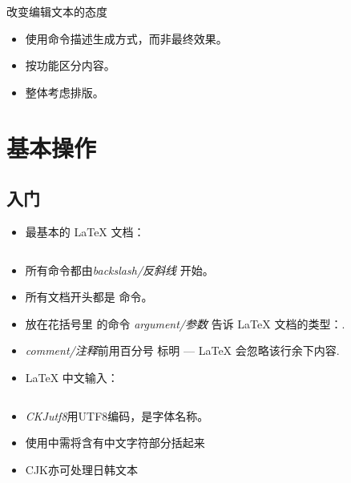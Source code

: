 \documentclass{beamer}
\begin{document}
\begin{frame}[fragile]{改变编辑文本的态度}

\begin{itemize}
\item 使用命令描述生成方式，而非最终效果。
\item 按功能区分内容。
\item 整体考虑排版。
\end{itemize}
\end{frame}

\section{基本操作}

\subsection{入门}
\begin{frame}[fragile]{\insertsubsection}
\begin{itemize}
\item 最基本的 \LaTeX{} 文档：
\inputminted[frame=single]{latex}{basics.tex}
\item 所有命令都由\emph{backslash/反斜线} \keystrokebftt{\bs}开始。
\item 所有文档开头都是 命令。
\item 放在花括号里 \keystrokebftt{\{} \keystrokebftt{\}} 的命令 \emph{argument/参数} 告诉 \LaTeX{} 文档的类型：.
\item \emph{comment/注释}前用百分号 \keystrokebftt{\%} 标明 --- \LaTeX{}
会忽略该行余下内容.
\end{itemize}
\end{frame}

\begin{frame}[fragile]{\insertsubsection}
\begin{itemize}
\item \LaTeX{} 中文输入：
\inputminted[frame=single]{latex}{basics-zh-cn.tex}
\item \emph{CKJutf8}用UTF8编码，是字体名称。
\item 使用中需将含有中文字符部分括起来
\item CJK亦可处理日韩文本
\end{itemize}
\end{frame}
\end{document}
